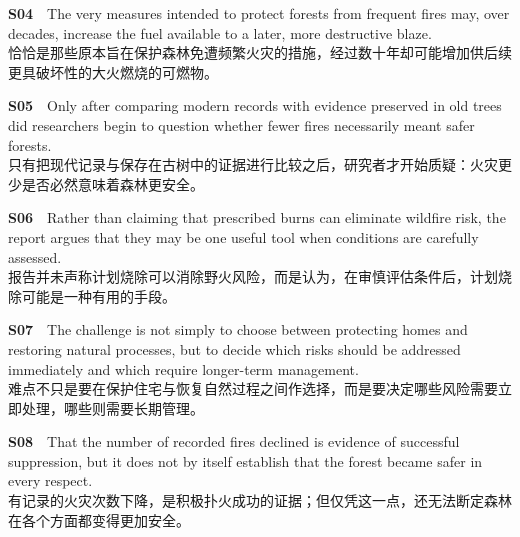 \documentclass[a4paper,11pt,openany]{report}
\newcommand{\zhline}[1]{{\CJKsf\color{bodygrey}#1}}
\begin{document}
\begin{samepage}
\textbf{S04}　The very measures intended to protect forests from frequent fires may, over decades, increase the fuel available to a later, more destructive blaze.\\
\zhline{恰恰是那些原本旨在保护森林免遭频繁火灾的措施，经过数十年却可能增加供后续更具破坏性的大火燃烧的可燃物。}
\par\end{samepage}

\begin{samepage}
\textbf{S05}　Only after comparing modern records with evidence preserved in old trees did researchers begin to question whether fewer fires necessarily meant safer forests.\\
\zhline{只有把现代记录与保存在古树中的证据进行比较之后，研究者才开始质疑：火灾更少是否必然意味着森林更安全。}
\par\end{samepage}

\begin{samepage}
\textbf{S06}　Rather than claiming that prescribed burns can eliminate wildfire risk, the report argues that they may be one useful tool when conditions are carefully assessed.\\
\zhline{报告并未声称计划烧除可以消除野火风险，而是认为，在审慎评估条件后，计划烧除可能是一种有用的手段。}
\par\end{samepage}

\begin{samepage}
\textbf{S07}　The challenge is not simply to choose between protecting homes and restoring natural processes, but to decide which risks should be addressed immediately and which require longer-term management.\\
\zhline{难点不只是要在保护住宅与恢复自然过程之间作选择，而是要决定哪些风险需要立即处理，哪些则需要长期管理。}
\par\end{samepage}

\begin{samepage}
\textbf{S08}　That the number of recorded fires declined is evidence of successful suppression, but it does not by itself establish that the forest became safer in every respect.\\
\zhline{有记录的火灾次数下降，是积极扑火成功的证据；但仅凭这一点，还无法断定森林在各个方面都变得更加安全。}
\par\end{samepage}
\end{document}
